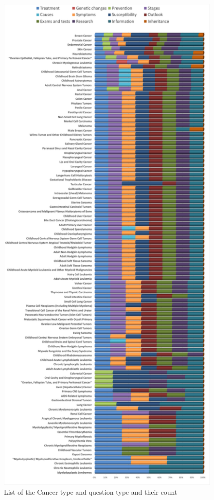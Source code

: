 	 \begin{figure}[t]
	 	\centering
	 	\includegraphics[scale=0.797]{Images/Cancer_qtypes.png}
	 	\caption{List of the Cancer type and question type and their count}
	 	\label{fig:cancer-type-qtype-count}
	 \end{figure}

